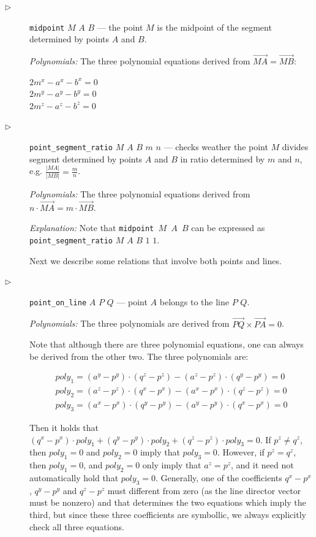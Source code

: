 \documentclass[final,1p,times,authoryear]{elsarticle}
\begin{document}
\begin{description}
\item[$\triangleright$] {\tt midpoint} $M$ $A$ $B$ --- the point
  $M$ is the midpoint of the segment determined by points $A$ and
  $B$.

{\em Polynomials:} The three polynomial equations derived from $\overrightarrow{MA} = \overrightarrow{MB}$:

\begin{tabbing}
$2m^x - a^x - b^x = 0$ \\ 
$2m^y - a^y - b^y = 0$ \\ 
$2m^z - a^z - b^z = 0$
\end{tabbing}

\item[$\triangleright$] {\tt point\_segment\_ratio} $M$ $A$ $B$ $m$
  $n$ --- checks weather the point $M$ divides segment determined by
  points $A$ and $B$ in ratio determined by $m$ and $n$,
  e.g. $\frac{|MA|}{|MB|} = \frac{m}{n}$.

{\em Polynomials:} The three polynomial equations derived from
$n\cdot \overrightarrow{MA} = m\cdot \overrightarrow{MB}$.

{\em Explanation:} Note that {\tt midpoint $M$ $A$ $B$} can be
expressed as {\tt point\_segment\_ratio} $M$ $A$ $B$ $1$ $1$.

\bigskip

Next we describe some relations that involve both points and lines.

\item[$\triangleright$] {\tt point\_on\_line} $A$ $P$ $Q$ --- point
  $A$ belongs to the line $P$ $Q$.

{\em Polynomials:} The three polynomials are derived from
$\overrightarrow{PQ} \times \overrightarrow{PA} = 0$.

Note that although there are three polynomial equations, one can
always be derived from the other two. The three polynomials are:

\begin{eqnarray*}
  poly_1 = (a^y - p^y)\cdot (q^z - p^z) - (a^z - p^z)\cdot (q^y - p^y) = 0\\
  poly_2 = (a^z - p^z)\cdot (q^x - p^x) - (a^x - p^x)\cdot (q^z - p^z) = 0\\
  poly_3 = (a^x - p^x)\cdot (q^y - p^y) - (a^y - p^y)\cdot (q^x - p^x) = 0
\end{eqnarray*}

Then it holds that
$(q^x - p^x) \cdot poly_1 + (q^y - p^y) \cdot poly_2 + (q^z - p^z)
\cdot poly_3 = 0$.
If $p^z \neq q^z$, then $poly_1 = 0$ and $poly_2 = 0$ imply that
$poly_3 = 0$. However, if $p^z = q^z$, then $poly_1 = 0$, and
$poly_2 = 0$ only imply that $a^z = p^z$, and it need not
automatically hold that $poly_3 = 0$. Generally, one of the
coefficients $q^x - p^x$, $q^y - p^y$ and $q^z - p^z$ must different
from zero (as the line director vector must be nonzero) and that
determines the two equations which imply the third, but since these
three coefficients are symbollic, we always explicitly check all three
equations. 


\end{description}
\end{document}
